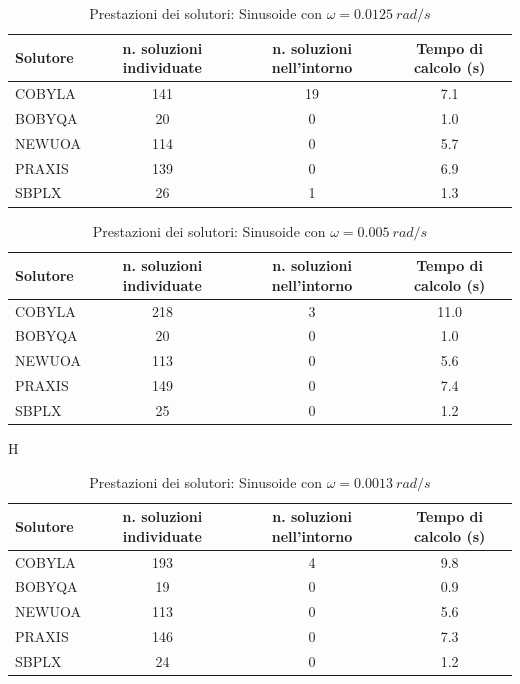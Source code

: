\documentclass[a4paper,12pt]{report}
\begin{document}
\begin{table}[H]
  \caption{Prestazioni dei solutori: Sinusoide con $\omega = 0.0125~rad/s$}
  \label{tab:prestazioni_sol0125}
  \center
    \begin{tabular}{lSSS}
      \toprule
      {Solutore} & {n. soluzioni individuate} & {n. soluzioni nell'intorno} & {Tempo di calcolo (s)} \\
      \midrule
      COBYLA & 141  &    19     &  7.1 \\
      BOBYQA & 20   &     0     &   1.0 \\
      NEWUOA & 114   &     0    &   5.7 \\
      PRAXIS & 139   &     0     &  6.9 \\
      SBPLX  & 26   &     1     &   1.3 \\
      \bottomrule
    \end{tabular}
\end{table}

\begin{table}[H]
  \caption{Prestazioni dei solutori: Sinusoide con $\omega = 0.005~rad/s$}
  \label{tab:prestazioni_sol005}
  \center
    \begin{tabular}{lSSS}
      \toprule
      {Solutore} & {n. soluzioni individuate} & {n. soluzioni nell'intorno} & {Tempo di calcolo (s)} \\
      \midrule
      COBYLA & 218  &     3     &  11.0 \\
      BOBYQA & 20   &     0     &   1.0 \\
      NEWUOA & 113  &     0     &   5.6 \\
      PRAXIS & 149  &     0     &  7.4 \\
      SBPLX & 25   &     0     &   1.2 \\
      \bottomrule
    \end{tabular}
\end{table}

\begin{table}{H}
  \caption{Prestazioni dei solutori: Sinusoide con $\omega = 0.0013~rad/s$}
  \label{tab:prestazioni_sol0013}
  \center
    \begin{tabular}{lSSS}
      \toprule
      {Solutore} & {n. soluzioni individuate} & {n. soluzioni nell'intorno} & {Tempo di calcolo (s)} \\
      \midrule
      COBYLA & 193  &     4     &  9.8 \\
      BOBYQA & 19   &     0     &  0.9 \\
      NEWUOA & 113   &     0    &  5.6 \\
      PRAXIS & 146   &     0    &  7.3 \\
      SBPLX  & 24   &     0     &  1.2 \\
      \bottomrule
    \end{tabular}
\end{table}
\end{document}
